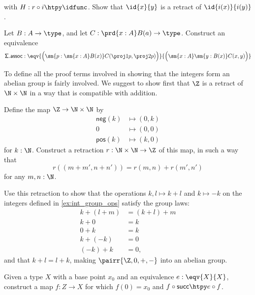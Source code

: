 \begin{exercises}
\begin{equation*}
\end{equation*}
with $H:r\circ i\htpy \idfunc$. Show that $\id{x}{y}$ is a retract of $\id{i(x)}{i(y)}$.
\item Let $B:A\to \type$, and let $C:\prd{x:A}B(a)\to\type$. Construct an equivalence
\begin{equation*}
\mathsf{\Sigma.assoc}:\eqv{\Big(\sm{p:\sm{x:A}B(x)}C(\proj 1 p,\proj 2 p)\Big)}{\Big(\sm{x:A}\sm{y:B(x)}C(x,y)\Big)}
\end{equation*}
\item \label{ex:int_group_laws} To define all the proof terms involved in showing that the integers form an abelian group is fairly involved. We suggest to show first that $\Z$ is a retract of $\N\times\N$ in a way that is compatible with addition.
\begin{subexenum}
\item Define the map $\Z\to\N\times\N$ by
\begin{align*}
\mathsf{neg}(k) & \mapsto (0,k) \\
0 & \mapsto (0,0) \\
\mathsf{pos}(k) & \mapsto (k,0)
\end{align*}
for $k:\N$. Construct a retraction $r:\N\times \N\to \Z$ of this map, in such a way that 
\begin{equation*}
r((m+m',n+n'))=r(m,n)+r(m',n')
\end{equation*}
for any $m,n:\N$.
\item Use this retraction to show that the operations $k,l\mapsto k+l$ and $k\mapsto -k$ on the integers defined in \autoref{ex:int_group_ops} satisfy the group laws:
\begin{align*}
k+(l+m) & = (k+l)+m \\
k+0 & = k \\
0+k & = k \\
k+(-k) & = 0 \\
(-k) + k & = 0,
\end{align*}
and that $k+l=l+k$, making $\pairr{\Z,0,+,-}$ into an abelian group.
\end{subexenum}
\item \label{ex:int_ptd_auto} Given a type $X$ with a base point $x_0$ and an equivalence $e:\eqv{X}{X}$, construct a map $f:Z\to X$ for which $f(0)=x_0$ and $f\circ\mathsf{succ} \htpy e\circ f$. 
\end{exercises}
